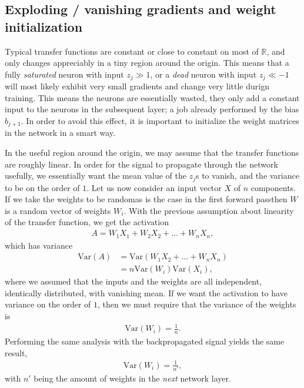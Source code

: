 \documentclass[a4paper, twocolumn]{article}
\begin{document}
\subsection{Exploding / vanishing gradients and weight initialization}
Typical transfer functions are constant or close to constant on most of $\mathds{R}$, and only changes appreciably in a tiny region around the origin. This means that a fully \textit{saturated} neuron with input $z_j\gg1$, or a \textit{dead} neuron with input $z_j\ll-1$ will most likely exhibit very small gradients and change very little durign training. This means the neurons are essentially wasted, they only add a constant input to the neurons in the subsequent layer; a job already performed by the bias $b_{j+1}$. In order to avoid this effect, it is important to initialize the weight matrices in the network in a smart way. 

In the useful region around the origin, we may assume that the transfer functions are roughly linear. In order for the signal to propagate through the network usefully, we essentially want the mean value of the $z_j$s to vanish, and the variance to be on the order of $1$. Let us now consider an input vector $X$ of $n$ components. If we take the weights to be random\textemdash as is the case in the first forward pass\textemdash then $W$ is a random vector of weights $W_i$. With the previous assumption about linearity of the transfer function, we get the activation 
\begin{align}
A=W_1X_1+W_2X_2+\dots+W_nX_n,
\end{align}
which has variance 
\begin{align}
\text{Var}(A) &= \text{Var}(W_1X_2+\dots+W_nX_n) \nonumber \\
%
&= n\text{Var}(W_i)\text{Var}(X_i),
\end{align}
where we assumed that the inputs and the weights are all independent, identically distributed, with vanishing mean. If we want the activation to have variance on the order of $1$, then we must require that the variance of the weights is 
\begin{align}
\text{Var}(W_i) = \frac{1}{n}.
\end{align}
Performing the same analysis with the backpropagated signal yields the same result,
\begin{align}
\text{Var}(W_i) = \frac{1}{n'},
\end{align}
with $n'$ being the amount of weights in the \textit{next} network layer. 
\end{document}
